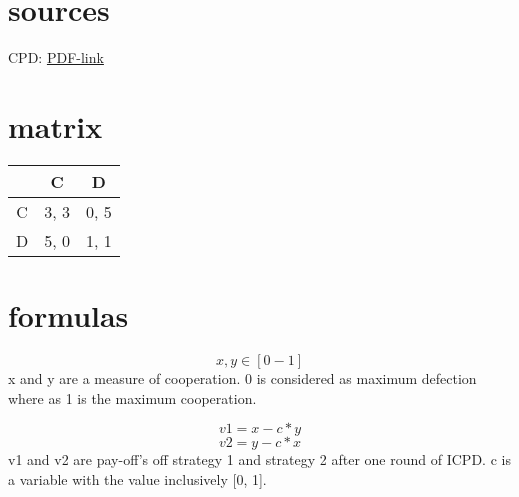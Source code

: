 \documentclass[]{article}
\begin{document}
\section{sources}
	CPD: 
	\href{https://www.sciencedirect.com/science/article/pii/S0022519399909967}{PDF-link}
	
\section{matrix}
	
\begin{center}
\begin{tabular}{ c|c|c }
   & C & D \\ 
   \hline
 C & 3, 3 & 0, 5\\  
   \hline
 D & 5, 0 & 1, 1
\end{tabular}
\end{center}

\section{formulas}


$$x, y \in [0-1]$$
	x and y are a measure of cooperation. 0 is considered as maximum defection where as 1 is the maximum cooperation.

$$v1 = x - c*y$$
$$v2 = y - c*x$$
v1 and v2 are pay-off's off strategy 1 and strategy 2 after one round of ICPD. c is a variable with the value inclusively [0, 1].
\end{document}
